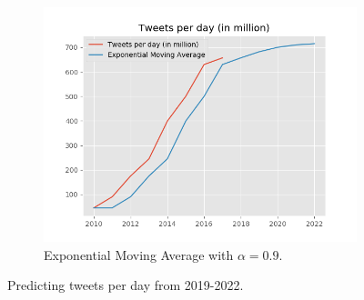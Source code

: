\begin{figure}[t]
\begin{subfigure}[t]{0.30\linewidth}
\label{fig:pla2}
\end{subfigure}
\begin{subfigure}[t]{0.30\linewidth}
\includegraphics[width=\linewidth ]{fig/tweets_ema.png}
\caption{{\footnotesize Exponential Moving Average with $\alpha = 0.9$.}}\vspace{-2mm}
\label{fig:pla2}
\end{subfigure}
\caption{Predicting tweets per day from 2019-2022.}\vspace{-2mm}
\label{fig:tweet_day}
\end{figure}

